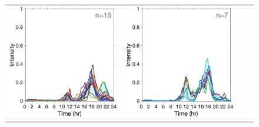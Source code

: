 \documentclass{article}
\begin{document}
\begin{figure}[h!]
	
	\begin{center}
		\begin{tabular}{cccc}
			\includegraphics[scale=0.1]{../2Fittedy/plot/holiday_5/fitted_y_cluster5_1.eps} 
			&\hspace*{-0.6cm}
			\includegraphics[scale=0.1]{../2Fittedy/plot/holiday_5/fitted_y_cluster5_2.eps} 

\end{tabular}
\end{center}
\end{figure}
\end{document}
